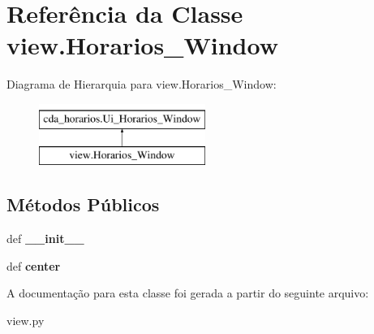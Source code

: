 \hypertarget{classview_1_1Horarios__Window}{\section{\-Referência da \-Classe view.\-Horarios\-\_\-\-Window}
\label{classview_1_1Horarios__Window}
}
\-Diagrama de \-Hierarquia para view.\-Horarios\-\_\-\-Window\-:\begin{figure}[H]
\begin{center}
\leavevmode
\includegraphics[height=2.000000cm]{classview_1_1Horarios__Window}
\end{center}
\end{figure}
\subsection*{\-Métodos \-Públicos}
\begin{DoxyCompactItemize}
\item 
\hypertarget{classview_1_1Horarios__Window_a30069daa04a00f9df48f8ed6d9f6d815}{def {\bfseries \-\_\-\-\_\-init\-\_\-\-\_\-}}\label{classview_1_1Horarios__Window_a30069daa04a00f9df48f8ed6d9f6d815}

\item 
\hypertarget{classview_1_1Horarios__Window_a993d375343d26fcf6fbbef42cd2b716c}{def {\bfseries center}}\label{classview_1_1Horarios__Window_a993d375343d26fcf6fbbef42cd2b716c}

\end{DoxyCompactItemize}


\-A documentação para esta classe foi gerada a partir do seguinte arquivo\-:\begin{DoxyCompactItemize}
\item 
view.\-py\end{DoxyCompactItemize}
